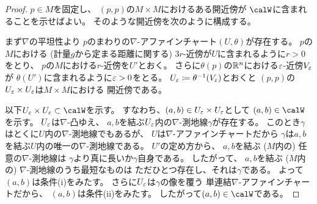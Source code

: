 \documentclass[report]{jlreq}
\begin{document}
\begin{proof}
    $p \in M$を固定し、
    $(p, p)$の$M \times M$におけるある開近傍が
    $\calW$に含まれることを示せばよい。
    そのような開近傍を次のように構成する。

    まず$\nabla$の平坦性より
    $p$のまわりの$\nabla$-アファインチャート$(U, \theta)$が存在する。
    $p$の$M$における
    (計量$g$から定まる距離に関する)
    $3r$-近傍が$U$に含まれるように$r > 0$をとり、
    $p$の$M$における$r$-近傍を$U'$とおく。
    さらに$\theta(p)$の$\mathbb{R}^n$における$\varepsilon$-近傍$V_\varepsilon$が
    $\theta(U')$に含まれるように$\varepsilon > 0$をとる。
    $U_\varepsilon \coloneqq \theta^{-1}(V_\varepsilon)$とおくと
    $(p, p)$の$U_\varepsilon \times U_\varepsilon$は$M \times M$における
    開近傍である。

    以下$U_\eps \times U_\eps \subset \calW$を示す。
    すなわち、$(a, b) \in U_\varepsilon \times U_\varepsilon$として
    $(a, b) \in \calW$を示す。
    $U_\varepsilon$は$\nabla$-凸ゆえ、
    $a, b$を結ぶ$U_\varepsilon$内の$\nabla$-測地線$\gamma$が存在する。
    このとき$\gamma$はとくに$U$内の$\nabla$-測地線でもあるが、
    $U$は$\nabla$-アファインチャートだから
    $\gamma$は$a, b$を結ぶ$U$内の唯一の$\nabla$-測地線である。
    $U'$の定め方から、
    $a, b$を結ぶ ($M$内の) 任意の$\nabla$-測地線は
    $\gamma$より真に長いか$\gamma$自身である。
    したがって、
    $a, b$を結ぶ ($M$内の) $\nabla$-測地線のうち最短なものは
    ただひとつ存在し、それは$\gamma$である。
    よって$(a, b)$は条件(i)をみたす。
    さらに$U_\varepsilon$は$\gamma$の像を覆う
    単連結$\nabla$-アファインチャートだから、
    $(a, b)$は条件(ii)をみたす。
    したがって$(a, b) \in \calW$である。
\end{proof}
\end{document}
